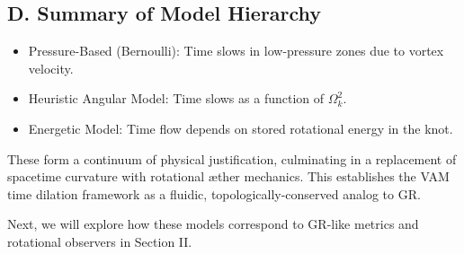 \subsection*{D. Summary of Model Hierarchy}

\begin{itemize}
\item Pressure-Based (Bernoulli): Time slows in low-pressure zones due to vortex velocity.
\item Heuristic Angular Model: Time slows as a function of $\Omega_k^2$.
\item Energetic Model: Time flow depends on stored rotational energy in the knot.
\end{itemize}

These form a continuum of physical justification, culminating in a replacement of spacetime curvature with rotational æther mechanics. This establishes the VAM time dilation framework as a fluidic, topologically-conserved analog to GR.

Next, we will explore how these models correspond to GR-like metrics and rotational observers in Section II.